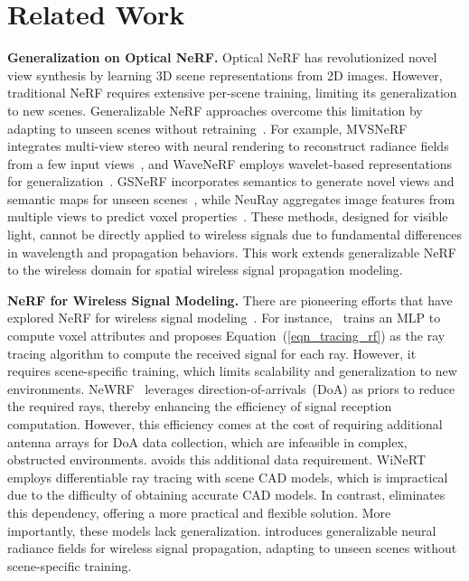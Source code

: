 \section{Related Work}
\label{sec_relatedWork}

\textbf{Generalization on Optical NeRF.}  
Optical NeRF has revolutionized novel view synthesis by learning 3D scene representations from 2D images. 
However, traditional NeRF requires extensive per-scene training, limiting its generalization to new scenes. Generalizable NeRF approaches overcome this limitation by adapting to unseen scenes without retraining~\cite{trevithick2020grf, chen2021mvsnerf, 10377995, chou2024gsnerf, tian2023mononerf, liu2022neural}. 
For example, MVSNeRF integrates multi-view stereo with neural rendering to reconstruct radiance fields from a few input views~\cite{chen2021mvsnerf}, and WaveNeRF employs wavelet-based representations for generalization~\cite{10377995}. 
GSNeRF incorporates semantics to generate novel views and semantic maps for unseen scenes~\cite{chou2024gsnerf}, while NeuRay aggregates image features from multiple views to predict voxel properties~\cite{liu2022neural}. 
These methods, designed for visible light, cannot be directly applied to wireless signals due to fundamental differences in wavelength and propagation behaviors.
This work extends generalizable NeRF to the wireless domain for spatial wireless signal propagation modeling.


\textbf{NeRF for Wireless Signal Modeling.}
There are pioneering efforts that have explored NeRF for wireless signal modeling~\cite{zhao2023nerf, orekondy2022winert}.
For instance, \nerft~trains an MLP to compute voxel attributes and proposes Equation~(\ref{eqn_tracing_rf}) as the ray tracing algorithm to compute the received signal for each ray. 
However, it requires scene-specific training, which limits scalability and generalization to new environments.
NeWRF~\cite{lunewrf} leverages direction-of-arrivals~(DoA) as priors to reduce the required rays, thereby enhancing the efficiency of signal reception computation. 
However, this efficiency comes at the cost of requiring additional antenna arrays for DoA data collection, which are infeasible in complex, obstructed environments.
\ourSystem avoids this additional data requirement.
WiNeRT~\cite{orekondy2022winert} employs differentiable ray tracing with scene CAD models, which is impractical due to the difficulty of obtaining accurate CAD models. 
In contrast, \ourSystem eliminates this dependency, offering a more practical and flexible solution.
More importantly, these models lack generalization. 
\ourSystem introduces generalizable neural radiance fields for wireless signal propagation, adapting to unseen scenes without scene-specific training.